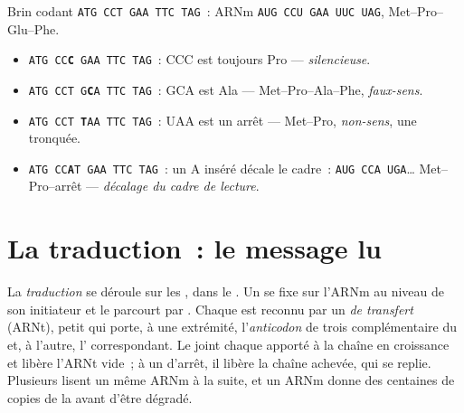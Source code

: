 \begin{example}\label{ex:g11:gene-expression:outcomes}
Brin codant \texttt{ATG CCT GAA TTC TAG}~: ARNm
\texttt{AUG CCU GAA UUC UAG},  Met--Pro--Glu--Phe.
\begin{itemize}
  \item \texttt{ATG CC\textbf{C} GAA TTC TAG}~: CCC est toujours Pro
        ---  \emph{silencieuse}.
  \item \texttt{ATG CCT G\textbf{C}A TTC TAG}~: GCA est Ala ---
        Met--Pro--Ala--Phe, \emph{faux-sens}.
  \item \texttt{ATG CCT \textbf{T}AA TTC TAG}~: UAA est un arrêt ---
        Met--Pro, \emph{non-sens}, une  tronquée.
  \item \texttt{ATG CC\textbf{A}T GAA TTC TAG}~: un A inséré décale le
        cadre~: \texttt{AUG CCA UGA}\dots{} Met--Pro--arrêt ---
        \emph{décalage du cadre de lecture}.
\end{itemize}
\end{example}

\section{La traduction~: le message lu}

\begin{proposition}[La traduction]\label{prop:g11:gene-expression:translation}
La \emph{traduction} se déroule sur les
\emph{}, dans le . Un  se fixe sur l'ARNm au
niveau de son  initiateur et le parcourt  par . Chaque
 est reconnu par un \emph{ de transfert} (ARNt), petit  qui
porte, à une extrémité, l'\emph{anticodon} de trois 
complémentaire du  et, à l'autre, l' correspondant. Le
 joint chaque  apporté à la chaîne en croissance et
libère l'ARNt vide~; à un  d'arrêt, il libère la chaîne achevée,
qui se replie. Plusieurs  lisent un même ARNm à la suite, et
un ARNm donne des centaines de copies de la  avant d'être
dégradé.
\end{proposition}
\admitted

